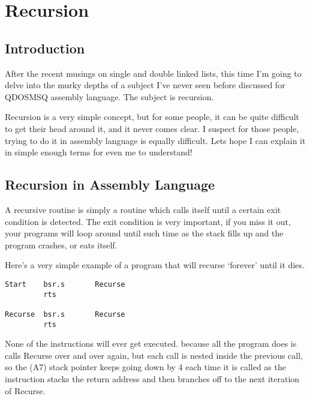 \chapter{Recursion}

\section{Introduction}
\label{ch13-intro}%

After the recent musings on single and double linked lists, this
    time I'm going to delve into the murky depths of a subject I've never seen
    before discussed for QDOSMSQ assembly language. The subject is
    recursion.

Recursion is a very simple concept, but for some people, it can be
    quite difficult to get their head around it, and it never comes clear. I
    suspect for those people, trying to do it in assembly language is equally
    difficult. Lets hope I can explain it in simple enough terms for even me
    to understand!

\section{Recursion in Assembly Language}
\label{ch13-recursion}%

A recursive routine is simply a routine which calls itself until a
    certain exit condition is detected. The exit condition is very important,
    if you miss it out, your programs will loop around until such time as the
    stack fills up and the program crashes, or eats itself.

Here's a very simple example of a program that will recurse
    `forever' until it dies.

\begin{lstlisting}[firstnumber=1,caption={Very Faulty Recursive Program}]
Start    bsr.s       Recurse
         rts

Recurse  bsr.s       Recurse
         rts
\end{lstlisting}

None of the  instructions will ever get executed. because all the
    program does is calls Recurse over and over again, but each call is nested
    inside the previous call, so the (A7) stack pointer keeps going down by 4
    each time it is called as the  instruction stacks the return address
    and then branches off to the next iteration of Recurse.

